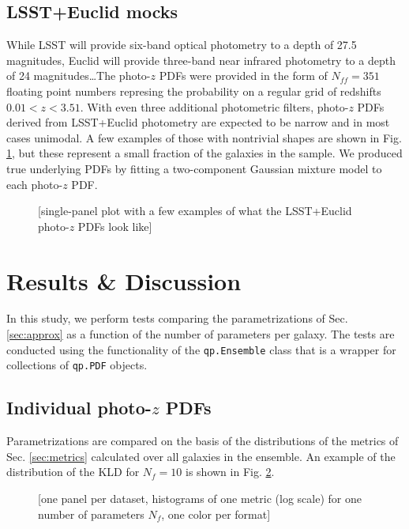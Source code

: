\documentclass[\docopts]{\docclass}
\newcommand{\pz}{photo-$z$ PDF}
\begin{document}
\subsection{LSST+Euclid mocks}
\label{sec:mg}


While LSST will provide six-band optical photometry to a depth of 27.5 
magnitudes, Euclid will provide three-band near infrared photometry to a depth 
of 24 magnitudes\dots  The \pz s were provided in the form of $N_{ff}=351$ 
floating point numbers represing the probability on a regular grid of redshifts 
$0.01 < z < 3.51$.  With even three additional photometric filters, \pz s 
derived from LSST+Euclid photometry are expected to be narrow and in most cases 
unimodal.  A few examples of those with nontrivial shapes are shown in Fig. 
\ref{fig:mg}, but these represent a small fraction of the galaxies in the 
sample.  We produced true underlying PDFs by fitting a two-component Gaussian 
mixture model to each \pz.

\begin{figure}
  \caption{[single-panel plot with a few examples of what the LSST+Euclid \pz s 
look like]
  \label{fig:mg}}
\end{figure}


\section{Results \& Discussion}
\label{sec:results}


In this study, we perform tests comparing the parametrizations of Sec. 
\ref{sec:approx} as a function of the number of parameters per galaxy.  The 
tests are conducted using the functionality of the \texttt{qp.Ensemble} class 
that is a wrapper for collections of \texttt{qp.PDF} objects.

\subsection{Individual \pz s}
\label{sec:individual}

Parametrizations are compared on the basis of the distributions of the metrics 
of Sec. \ref{sec:metrics} calculated over all galaxies in the ensemble.  An 
example of the distribution of the KLD for $N_{f}=10$ is shown in Fig. 
\ref{fig:individual}.

\begin{figure}
  \caption{[one panel per dataset, histograms of one metric (log scale) for one 
number of parameters $N_{f}$, one color per format]
  \label{fig:individual}}
\end{figure}
\end{document}
